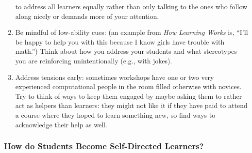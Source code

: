 \begin{enumerate}
  to address all learners equally rather than only talking to the ones
  who follow along nicely or demands more of your attention.
\item
  Be mindful of low-ability cues: (an example from \emph{How Learning
  Works} is, ``I'll be happy to help you with this because I know girls
  have trouble with math.'') Think about how you address your students
  and what stereotypes you are reinforcing unintentionally (e.g., with
  jokes).
\item
  Address tensions early: sometimes workshops have one or two very
  experienced computational people in the room filled otherwise with
  novices. Try to think of ways to keep them engaged by maybe asking
  them to rather act as helpers than learners: they might not like it if
  they have paid to attend a course where they hoped to learn something
  new, so find ways to acknowledge their help as well.
\end{enumerate}

\subsubsection{How do Students Become Self-Directed
Learners?}\label{how-do-students-become-self-directed-learners}

